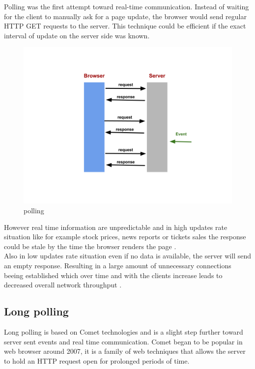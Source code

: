 Polling was the first attempt toward real-time communication. Instead of waiting
for the client to manually ask for a page update, the browser would send regular
HTTP GET requests to the server. This technique could be efficient if the exact
interval of update on the server side was known.\\

\begin{figure}[H]
\centering
\includegraphics[width=\textwidth]{./Figures/polling.png}
\caption[Polling]{polling}
\label{fig:polling}
\end{figure}

However real time information are unpredictable and in high updates rate
situation like for example stock prices, news reports or tickets sales the
response could be stale by the time the browser renders the page
\citep{Reference32}.\\

Also in low updates rate situation even if no data is available, the server
will send an empty response. Resulting in a large amount of unnecessary
connections beeing established which over time and with the clients increase
leads to decreased overall network throughput \citep{Reference2}. \\


\subsection{Long polling}

Long polling is based on Comet technologies and is a slight step further toward
server sent events and real time communication. Comet began to be popular in web
browser around 2007, it is a family of web techniques that allows the server to
hold an HTTP request open for prolonged periods of time.\\

